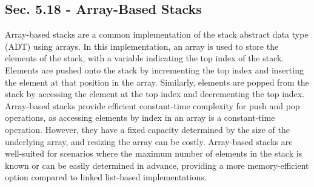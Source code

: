 \subsection*{Sec. 5.18 - Array-Based Stacks}

Array-based stacks are a common implementation of the stack abstract data type (ADT) using arrays. In this implementation, an array is used to store the elements of the stack, with a variable indicating the top index of the stack. Elements are pushed onto the stack by incrementing the top index and inserting the element at that position in the array. Similarly, 
elements are popped from the stack by accessing the element at the top index and decrementing the top index. Array-based stacks provide efficient constant-time complexity for push and pop operations, as accessing elements by index in an array is a constant-time operation. However, they have a fixed capacity determined by the size of the underlying array, and resizing 
the array can be costly. Array-based stacks are well-suited for scenarios where the maximum number of elements in the stack is known or can be easily determined in advance, providing a more memory-efficient option compared to linked list-based implementations.

